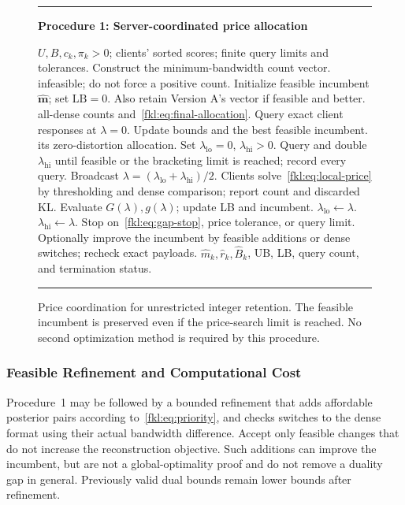 \begin{figure}[t]
\hrule\vspace{4pt}
\textbf{Procedure 1: Server-coordinated price allocation}
\vspace{3pt}
\footnotesize
\begin{algorithmic}[1]
\Require $U,B,c_k,\pi_k>0$; clients' sorted scores; finite query limits and tolerances.
\State Construct the minimum-bandwidth count vector.
 \State \Return infeasible; do not force a positive count.
\EndIf
\State Initialize feasible incumbent $\widehat{\mathbf m}$; set $\mathrm{LB}=0$.
\State Also retain Version A's vector if feasible and better.
 \State \Return all-dense counts and~\eqref{fkl:eq:final-allocation}.
\EndIf
\State Query exact client responses at $\lambda=0$.
\State Update bounds and the best feasible incumbent.
 \State \Return its zero-distortion allocation.
\EndIf
\State Set $\lambda_{\mathrm{lo}}=0$, $\lambda_{\mathrm{hi}}>0$.
\State Query and double $\lambda_{\mathrm{hi}}$ until feasible or the bracketing limit is reached; record every query.
  \State Broadcast $\lambda=(\lambda_{\mathrm{lo}}+\lambda_{\mathrm{hi}})/2$.
  \State Clients solve~\eqref{fkl:eq:local-price} by thresholding and dense comparison; report count and discarded KL.
  \State Evaluate $G(\lambda),g(\lambda)$; update LB and incumbent.
   \State $\lambda_{\mathrm{lo}}\gets\lambda$.
  \Else
   \State $\lambda_{\mathrm{hi}}\gets\lambda$.
  \EndIf
  \State Stop on~\eqref{fkl:eq:gap-stop}, price tolerance, or query limit.
 \EndFor
\EndIf
\State Optionally improve the incumbent by feasible additions or dense switches; recheck exact payloads.
\State \Return $\widehat m_k,\widehat r_k,\widehat B_k$, UB, LB, query count, and termination status.
\end{algorithmic}
\vspace{4pt}\hrule
\caption{Price coordination for unrestricted integer retention. The feasible incumbent is preserved even if the price-search limit is reached. No second optimization method is required by this procedure.}
\label{fkl:fig:algorithm}
\end{figure}

\subsubsection{Feasible Refinement and Computational Cost}
Procedure~1 may be followed by a bounded refinement that adds affordable posterior pairs according to~\eqref{fkl:eq:priority}, and checks switches to the dense format using their actual bandwidth difference. Accept only feasible changes that do not increase the reconstruction objective. Such additions can improve the incumbent, but are not a global-optimality proof and do not remove a duality gap in general. Previously valid dual bounds remain lower bounds after refinement.


